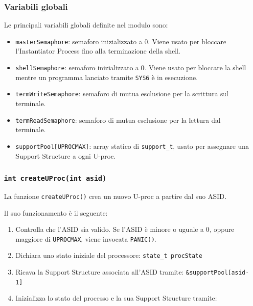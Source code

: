 \documentclass[a4paper,12pt]{article}
\begin{document}
\begin{enumerate}
\subsubsection{Variabili globali}

Le principali variabili globali definite nel modulo sono:

\begin{itemize}
    \item \texttt{masterSemaphore}: semaforo inizializzato a 0. Viene usato per bloccare l'Instantiator Process fino alla terminazione della shell.
    \item \texttt{shellSemaphore}: semaforo inizializzato a 0. Viene usato per bloccare la shell mentre un programma lanciato tramite \texttt{SYS6} è in esecuzione.
    \item \texttt{termWriteSemaphore}: semaforo di mutua esclusione per la scrittura sul terminale.
    \item \texttt{termReadSemaphore}: semaforo di mutua esclusione per la lettura dal terminale.
    \item \texttt{supportPool[UPROCMAX]}: array statico di \texttt{support\_t}, usato per assegnare una Support Structure a ogni U-proc.
\end{itemize}

\vspace{0.3cm}
\subsubsection{\texttt{int createUProc(int asid)}}

La funzione \texttt{createUProc()} crea un nuovo U-proc a partire dal suo ASID.

Il suo funzionamento è il seguente:

\begin{enumerate}
    \item Controlla che l'ASID sia valido. Se l'ASID è minore o uguale a 0, oppure maggiore di \texttt{UPROCMAX}, viene invocata \texttt{PANIC()}.

    \item Dichiara uno stato iniziale del processore: \texttt{state\_t procState}


    \item Ricava la Support Structure associata all'ASID tramite: \texttt{\&supportPool[asid-1]}


    \item Inizializza lo stato del processo e la sua Support Structure tramite: 
    

\end{enumerate}
\end{enumerate}
\end{document}
